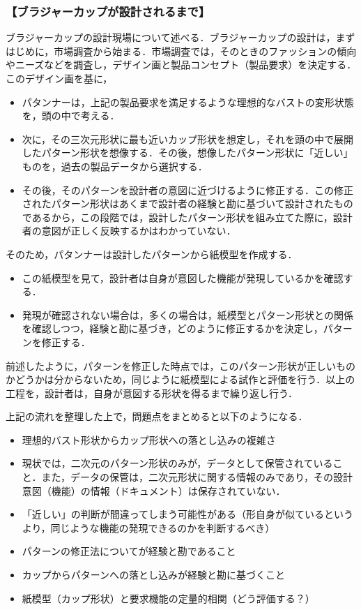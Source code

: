 \documentclass[11pt]{jsarticle}
\begin{document}
		\subsubsection{【ブラジャーカップが設計されるまで】}
			ブラジャーカップの設計現場について述べる．ブラジャーカップの設計は，まずはじめに，市場調査から始まる．市場調査では，そのときのファッションの傾向やニーズなどを調査し，デザイン画と製品コンセプト（製品要求）を決定する．このデザイン画を基に，
			\begin{itemize}
				\item パタンナーは，上記の製品要求を満足するような理想的なバストの変形状態を，頭の中で考える．
				\item 次に，その三次元形状に最も近いカップ形状を想定し，それを頭の中で展開したパターン形状を想像する．その後，想像したパターン形状に「近しい」ものを，過去の製品データから選択する．
				\item その後，そのパターンを設計者の意図に近づけるように修正する．この修正されたパターン形状はあくまで設計者の経験と勘に基づいて設計されたものであるから，この段階では，設計したパターン形状を組み立てた際に，設計者の意図が正しく反映するかはわかっていない．
			\end{itemize}
			そのため，パタンナーは設計したパターンから紙模型を作成する．
			\begin{itemize}
				\item この紙模型を見て，設計者は自身が意図した機能が発現しているかを確認する．
				\item 発現が確認されない場合は，多くの場合は，紙模型とパターン形状との関係を確認しつつ，経験と勘に基づき，どのように修正するかを決定し，パターンを修正する．
			\end{itemize}
			前述したように，パターンを修正した時点では，このパターン形状が正しいものかどうかは分からないため，同じように紙模型による試作と評価を行う．以上の工程を，設計者は，自身が意図する形状を得るまで繰り返し行う．
			
			上記の流れを整理した上で，問題点をまとめると以下のようになる．
			\begin{itemize}
				\item 理想的バスト形状からカップ形状への落とし込みの複雑さ
				\item 現状では，二次元のパターン形状のみが，データとして保管されていること．また，データの保管は，二次元形状に関する情報のみであり，その設計意図（機能）の情報（ドキュメント）は保存されていない．
				\item 「近しい」の判断が間違ってしまう可能性がある（形自身が似ているというより，同じような機能の発現できるのかを判断するべき）
				\item パターンの修正法についてが経験と勘であること
				\item カップからパターンへの落とし込みが経験と勘に基づくこと
				\item 紙模型（カップ形状）と要求機能の定量的相関（どう評価する？）
				
			\end{itemize}
\end{document}
